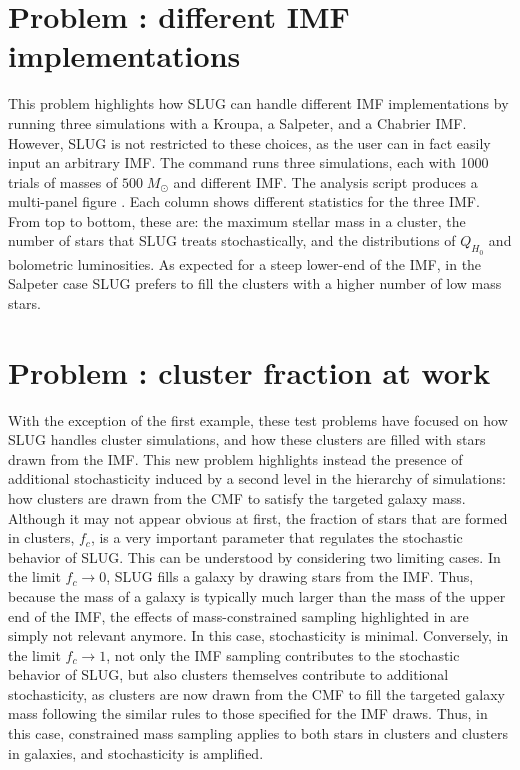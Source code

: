\documentclass[letterpaper,10pt,english]{sphinxmanual}
\begin{document}
\section{Problem : different IMF implementations}
\label{\detokenize{tests:problem-imfchoice-different-imf-implementations}}\label{\detokenize{tests:probimf-label}}
This problem highlights how SLUG can handle different IMF implementations by running
three simulations with a Kroupa, a Salpeter, and a Chabrier IMF. However, SLUG is not
restricted to these choices, as the user can in fact easily input an arbitrary IMF.
The command   runs three  simulations, each with 1000 trials
of masses of \(500\;M_\odot\) and different IMF. The analysis script
 produces a multi-panel figure .
Each column shows different statistics for the three IMF. From top to bottom, these are:
the maximum stellar mass in a cluster, the number of stars that SLUG treats stochastically,
and the distributions of \(Q_{H_0}\)  and bolometric luminosities.
As expected for a steep lower-end of the IMF, in the Salpeter case SLUG prefers to fill the
clusters with a higher number of low mass stars.


\section{Problem : cluster fraction at work}
\label{\detokenize{tests:problem-clfraction-cluster-fraction-at-work}}
With the exception of the first example, these test problems have focused on how SLUG handles
cluster simulations, and how these clusters are filled with stars drawn from the IMF.
This new problem highlights instead the presence of additional stochasticity induced by a
second level in the hierarchy of  simulations: how clusters are drawn from the CMF to satisfy the
targeted galaxy mass. Although it may not appear obvious at first,
the fraction of stars that are formed in clusters, \(f_c\), is a very important parameter that regulates
the stochastic behavior of SLUG. This can be understood by considering two limiting cases.
In the limit \(f_c \rightarrow 0\), SLUG fills a galaxy by drawing stars from the
IMF. Thus, because the mass of a galaxy is typically much larger than the mass of the upper
end of the IMF, the effects of mass-constrained sampling highlighted in {\hyperref[\detokenize{tests:probsampl-label}]{}} are simply
not relevant anymore. In this case, stochasticity is minimal.
Conversely, in the limit \(f_c \rightarrow 1\), not only the IMF sampling contributes to the
stochastic behavior of SLUG, but also clusters themselves contribute to additional stochasticity,
as clusters are now drawn from the CMF to fill the targeted galaxy mass following the similar rules
to those specified for the IMF draws. Thus, in this case, constrained mass sampling applies to both
stars in clusters and clusters in galaxies, and stochasticity is amplified.
\end{document}

